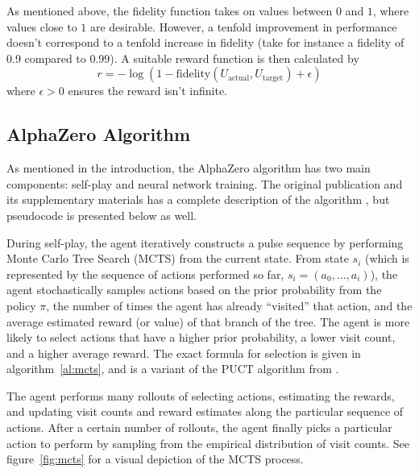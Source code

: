 As mentioned above, the fidelity function takes on values between $0$ and $1$, where values close to $1$ are desirable.
However, a tenfold improvement in performance doesn't correspond to a tenfold increase in fidelity (take for instance a fidelity of 0.9 compared to 0.99). A suitable reward function is then calculated by
\begin{equation}
    r = -\log(1-\text{fidelity}(U_\text{actual}, U_\text{target}) + \epsilon)
\end{equation}
where $\epsilon>0$ ensures the reward isn't infinite.

\subsection{AlphaZero Algorithm}

As mentioned in the introduction, the AlphaZero algorithm has two main components: self-play and neural network training. The original publication and its supplementary materials has a complete description of the algorithm \cite{Silver1140}, but pseudocode is presented below as well.

During self-play, the agent iteratively constructs a pulse sequence by performing Monte Carlo Tree Search (MCTS) from the current state. From state $s_i$ (which is represented by the sequence of actions performed so far, $s_i = (a_0, \dots, a_i)$), the agent stochastically samples actions based on the prior probability from the policy $\pi$, the number of times the agent has already ``visited'' that action, and the average estimated reward (or value) of that branch of the tree. The agent is more likely to select actions that have a higher prior probability, a lower visit count, and a higher average reward. The exact formula for selection is given in algorithm~\ref{al:mcts},
and is a variant of the PUCT algorithm from \cite{Rosin:2011uu}.

The agent performs many rollouts of selecting actions, estimating the rewards, and updating visit counts and reward estimates along the particular sequence of actions. After a certain number of rollouts, the agent finally picks a particular action to perform by sampling from the empirical distribution of visit counts.
See figure~\ref{fig:mcts} for a visual depiction of the MCTS process.


